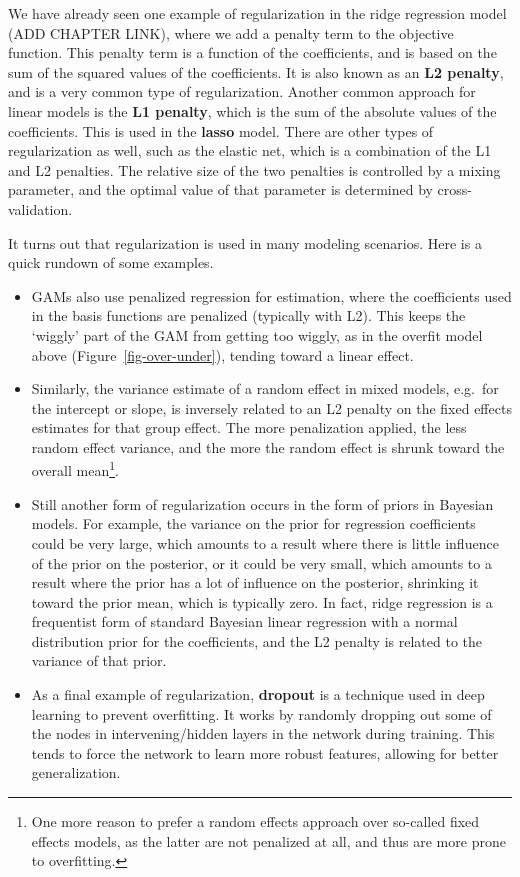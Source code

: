 \documentclass[
  letterpaper,
]{krantz}
\begin{document}
We have already seen one example of regularization in the ridge
regression model (ADD CHAPTER LINK), where we add a penalty term to the
objective function. This penalty term is a function of the coefficients,
and is based on the sum of the squared values of the coefficients. It is
also known as an \textbf{L2 penalty}, and is a very common type of
regularization. Another common approach for linear models is the
\textbf{L1 penalty}, which is the sum of the absolute values of the
coefficients. This is used in the \textbf{lasso} model. There are other
types of regularization as well, such as the elastic net, which is a
combination of the L1 and L2 penalties. The relative size of the two
penalties is controlled by a mixing parameter, and the optimal value of
that parameter is determined by cross-validation.

It turns out that regularization is used in many modeling scenarios.
Here is a quick rundown of some examples.

\begin{itemize}
\item
  GAMs also use penalized regression for estimation, where the
  coefficients used in the basis functions are penalized (typically with
  L2). This keeps the `wiggly' part of the GAM from getting too wiggly,
  as in the overfit model above (Figure~\ref{fig-over-under}), tending
  toward a linear effect.
\item
  Similarly, the variance estimate of a random effect in mixed models,
  e.g.~for the intercept or slope, is inversely related to an L2 penalty
  on the fixed effects estimates for that group effect. The more
  penalization applied, the less random effect variance, and the more
  the random effect is shrunk toward the overall mean\footnote{One more
    reason to prefer a random effects approach over so-called fixed
    effects models, as the latter are not penalized at all, and thus are
    more prone to overfitting.}.
\end{itemize}

\begin{itemize}
\item
  Still another form of regularization occurs in the form of priors in
  Bayesian models. For example, the variance on the prior for regression
  coefficients could be very large, which amounts to a result where
  there is little influence of the prior on the posterior, or it could
  be very small, which amounts to a result where the prior has a lot of
  influence on the posterior, shrinking it toward the prior mean, which
  is typically zero. In fact, ridge regression is a frequentist form of
  standard Bayesian linear regression with a normal distribution prior
  for the coefficients, and the L2 penalty is related to the variance of
  that prior.
\item
  As a final example of regularization, \textbf{dropout} is a technique
  used in deep learning to prevent overfitting. It works by randomly
  dropping out some of the nodes in intervening/hidden layers in the
  network during training. This tends to force the network to learn more
  robust features, allowing for better generalization.
\end{itemize}
\end{document}
